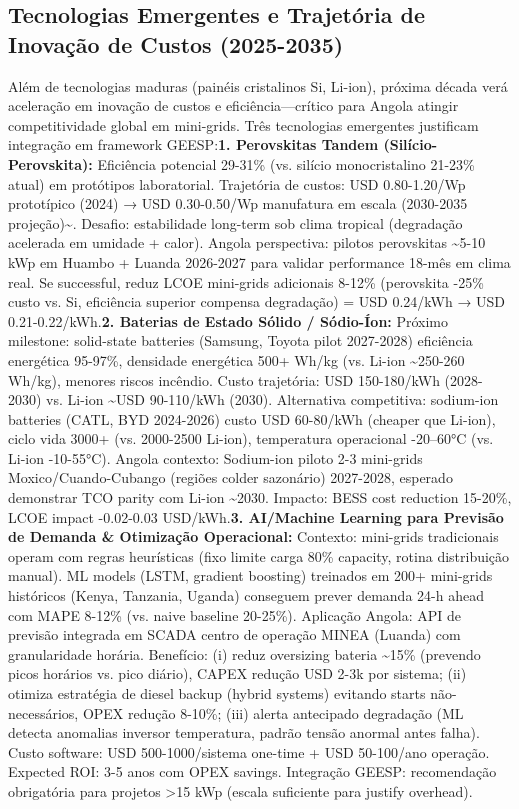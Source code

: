 \documentclass[12pt, a4paper]{article}
\begin{document}
\subsection{Tecnologias Emergentes e Trajetória de Inovação de Custos (2025-2035)}

Além de tecnologias maduras (painéis cristalinos Si, Li-ion), próxima década verá aceleração em inovação de custos e eficiência—crítico para Angola atingir competitividade global em mini-grids. Três tecnologias emergentes justificam integração em framework GEESP:\textbf{1. Perovskitas Tandem (Silício-Perovskita):}
Eficiência potencial 29-31\% (vs. silício monocristalino 21-23\% atual) em protótipos laboratorial. Trajetória de custos: USD 0.80-1.20/Wp prototípico (2024) → USD 0.30-0.50/Wp manufatura em escala (2030-2035 projeção)\textasciitilde{}\citep{NREL2024}. Desafio: estabilidade long-term sob clima tropical (degradação acelerada em umidade + calor). Angola perspectiva: pilotos perovskitas \textasciitilde{}5-10 kWp em Huambo + Luanda 2026-2027 para validar performance 18-mês em clima real. Se successful, reduz LCOE mini-grids adicionais 8-12\% (perovskita -25\% custo vs. Si, eficiência superior compensa degradação) = USD 0.24/kWh → USD 0.21-0.22/kWh.\textbf{2. Baterias de Estado Sólido / Sódio-Íon:}
Próximo milestone: solid-state batteries (Samsung, Toyota pilot 2027-2028) eficiência energética 95-97\%, densidade energética 500+ Wh/kg (vs. Li-ion \textasciitilde{}250-260 Wh/kg), menores riscos incêndio. Custo trajetória: USD 150-180/kWh (2028-2030) vs. Li-ion \textasciitilde{}USD 90-110/kWh (2030). Alternativa competitiva: sodium-ion batteries (CATL, BYD 2024-2026) custo USD 60-80/kWh (cheaper que Li-ion), ciclo vida 3000+ (vs. 2000-2500 Li-ion), temperatura operacional -20--60°C (vs. Li-ion -10-55°C). Angola contexto: Sodium-ion piloto 2-3 mini-grids Moxico/Cuando-Cubango (regiões colder sazonário) 2027-2028, esperado demonstrar TCO parity com Li-ion \textasciitilde{}2030. Impacto: BESS cost reduction 15-20\%, LCOE impact -0.02-0.03 USD/kWh.\textbf{3. AI/Machine Learning para Previsão de Demanda \& Otimização Operacional:}
Contexto: mini-grids tradicionais operam com regras heurísticas (fixo limite carga 80\% capacity, rotina distribuição manual). ML models (LSTM, gradient boosting) treinados em 200+ mini-grids históricos (Kenya, Tanzania, Uganda) conseguem prever demanda 24-h ahead com MAPE 8-12\% (vs. naive baseline 20-25\%). Aplicação Angola: API de previsão integrada em SCADA centro de operação MINEA (Luanda) com granularidade horária. Benefício: (i) reduz oversizing bateria \textasciitilde{}15\% (prevendo picos horários vs. pico diário), CAPEX redução USD 2-3k por sistema; (ii) otimiza estratégia de diesel backup (hybrid systems) evitando starts não-necessários, OPEX redução 8-10\%; (iii) alerta antecipado degradação (ML detecta anomalias inversor temperatura, padrão tensão anormal antes falha). Custo software: USD 500-1000/sistema one-time + USD 50-100/ano operação. Expected ROI: 3-5 anos com OPEX savings. Integração GEESP: recomendação obrigatória para projetos >15 kWp (escala suficiente para justify overhead).
\end{document}
